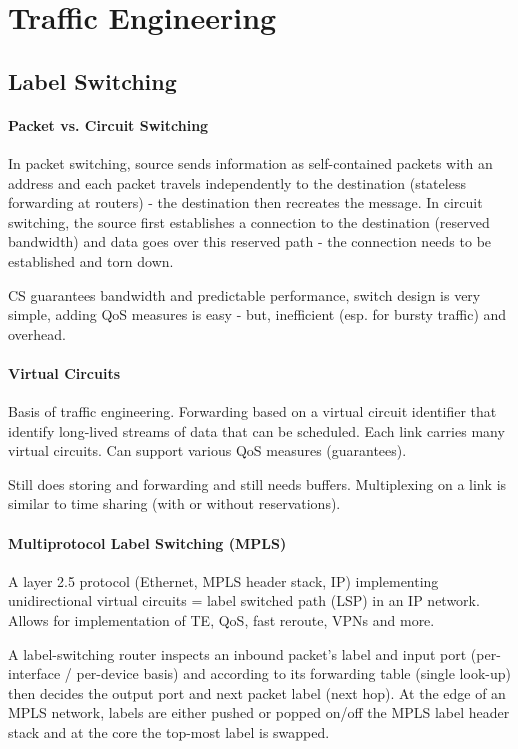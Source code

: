 \section{Traffic Engineering}

\subsection{Label Switching}

\paragraph{Packet vs. Circuit Switching}
In packet switching, source sends information as self-contained packets with an address and each packet travels independently to the destination (stateless forwarding at routers) - the destination then recreates the message. In circuit switching, the source first establishes a connection to the destination (reserved bandwidth) and data goes over this reserved path - the connection needs to be established and torn down.

CS guarantees bandwidth and predictable performance, switch design is very simple, adding QoS measures is easy - but, inefficient (esp. for bursty traffic) and overhead.

\paragraph{Virtual Circuits}
Basis of traffic engineering. Forwarding based on a virtual circuit identifier that identify long-lived streams of data that can be scheduled. Each link carries many virtual circuits. Can support various QoS measures (guarantees).

Still does storing and forwarding and still needs buffers. Multiplexing on a link is similar to time sharing (with or without reservations).

\paragraph{Multiprotocol Label Switching (MPLS)}
A layer 2.5 protocol (Ethernet, MPLS header stack, IP) implementing unidirectional virtual circuits = label switched path (LSP) in an IP network. Allows for implementation of TE, QoS, fast reroute, VPNs and more.

A label-switching router inspects an inbound packet's label and input port (per-interface / per-device basis) and according to its forwarding table (single look-up) then decides the output port and next packet label (next hop). At the edge of an MPLS network, labels are either pushed or popped on/off the MPLS label header stack and at the core the top-most label is swapped.

